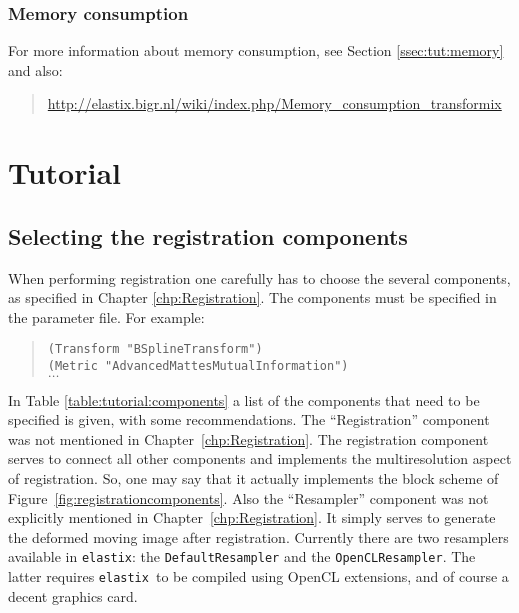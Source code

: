 \documentclass[]{report}
\newcommand{\elastix}{\texttt{elastix}}
\begin{document}
\subsection{Memory consumption}

For more information about memory consumption, see Section
\ref{ssec:tut:memory} and also:
\begin{quote}
\url{http://elastix.bigr.nl/wiki/index.php/Memory_consumption_transformix}
\end{quote}


\chapter{Tutorial}\label{chp:Tutorial}


\section{Selecting the registration components}

When performing registration one carefully has to choose the
several components, as specified in Chapter
\ref{chp:Registration}. The components must be specified in the
parameter file. For example:
\begin{quote}
\texttt{(Transform "BSplineTransform")}\\
\texttt{(Metric "AdvancedMattesMutualInformation")}\\
$\ldots$
\end{quote}

In Table \ref{table:tutorial:components} a list of the components
that need to be specified is given, with some recommendations. The
``Registration'' component was not mentioned in
Chapter~\ref{chp:Registration}. The registration component serves to
connect all other components and implements the multiresolution
aspect of registration. So, one may say that it actually implements
the block scheme of Figure~\ref{fig:registrationcomponents}. Also
the ``Resampler'' component was not explicitly mentioned in
Chapter~\ref{chp:Registration}. It simply serves to generate the
deformed moving image after registration. Currently there are two
resamplers available in \elastix: the \texttt{DefaultResampler} and
the \texttt{OpenCLResampler}. The latter requires \elastix\ to be
compiled using OpenCL extensions, and of course a decent graphics
card.
\end{document}
